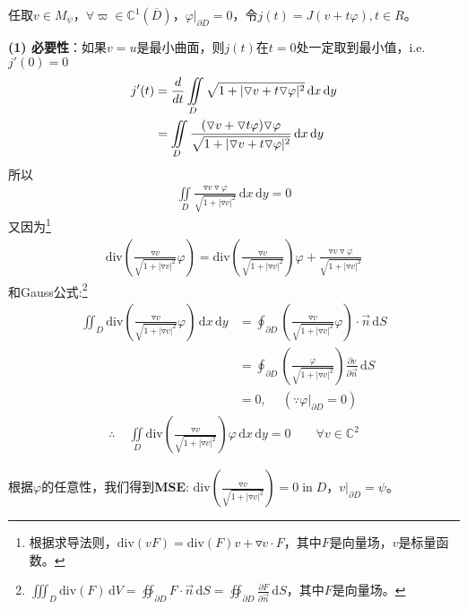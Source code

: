 \documentclass[11pt, a4paper]{article}
\theoremstyle{theorem}
\newcommand{\intd}[1]{\,\mathrm{d}{#1}}
\begin{document}
任取$v \in M_\psi$，$\forall \varpi \in \mathbb{C}^1(\overline{D})$，$\varphi |_{\partial D} = 0$，令$j(t) = J(v + t \varphi), t \in R$。

\textbf{(1) 必要性}：如果$v = u$是最小曲面，则$j(t)$在$t = 0$处一定取到最小值，i.e. $j'(0) = 0$
\begin{align}
    j'(t) &= \frac{d}{d t} \iint\limits_D \sqrt{1 + |\triangledown v + t \triangledown \varphi|^2} \intd x \intd y \notag \\
    &= \iint\limits_D \frac{(\triangledown v + \triangledown t \varphi) \triangledown \varphi}{\sqrt{1 + |\triangledown v + t \triangledown \varphi|^2}} \intd x \intd y
\end{align}
所以
\begin{align*}
\iint\limits_D \frac{\triangledown v \triangledown \varphi}{\sqrt{1 + |\triangledown v|^2}} \intd x \intd y = 0
\end{align*}
又因为\footnote{根据求导法则，$\text{div}(v F) = \text{div}(F)v + \triangledown v \cdot F$，其中$F$是向量场，$v$是标量函数。}
\begin{align*}
    \text{div}\left(\frac{\triangledown v}{\sqrt{1 + |\triangledown v|^2}} \varphi\right) = \text{div}\left(\frac{\triangledown v}{\sqrt{1 + |\triangledown v|^2}}\right) \varphi + \frac{\triangledown v \triangledown \varphi}{\sqrt{1 + |\triangledown v|^2}}
\end{align*}
和Gauss公式:\footnote{$\iiint_D \text{div}(F) \intd V = \oiint_{\partial D} F \cdot \vec{n} \intd S = \oiint_{\partial D} \frac{\partial F}{\partial \vec{n}} \intd S$，其中$F$是向量场。}
\begin{align*}
    \iint_D\text{div}\left(\frac{\triangledown v}{\sqrt{1 + |\triangledown v|^2}} \varphi\right) \intd x \intd y
    &= \oint_{\partial D} \left(\frac{\triangledown v}{\sqrt{1 + |\triangledown v|^2}} \varphi\right) \cdot \vec{n} \intd S \\
    &= \oint_{\partial D} \left(\frac{\varphi}{\sqrt{1 + |\triangledown v|^2}} \right) \frac{\partial v}{\partial \vec{n}} \intd S \\
    &= 0,\ \quad \left(\because \varphi\bigg|_{\partial D} = 0\right)
\end{align*}
\begin{align}
    \therefore \; &\iint\limits_D \text{div}\left(\frac{\triangledown v}{\sqrt{1 + |\triangledown v|^2}}\right) \varphi \intd x \intd y = 0 \quad\quad \forall v \in \mathbb{C}^2
\end{align}

根据$\varphi$的任意性，我们得到\textbf{MSE}: $\text{div}\left(\frac{\triangledown v}{\sqrt{1 + |\triangledown v|^2}}\right) = 0 \; \text{in} \; D$，$v|_{\partial D} = \psi$。
\end{document}
